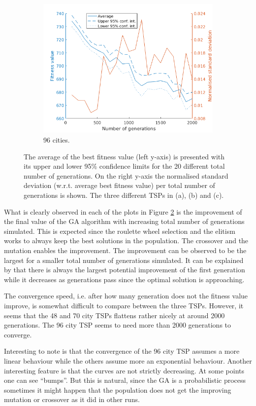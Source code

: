 \documentclass[]{article}
\begin{document}
\begin{figure}[H]
  \begin{subfigure}{\textwidth}
     \centering
     \includegraphics[width=0.5\linewidth]{../GA_TSP/t296.png}
     \caption{96 cities.}
     \label{sfig:t296}
  \end{subfigure}%
\caption{The average of the best fitness value (left y-axis) is presented with its upper and lower 95\% confidence limits for the 20 different total number of generations. On the right y-axis the normalised standard deviation (w.r.t. average best fitness value) per total number of generations is shown. The three different TSPs in (a), (b) and (c).}
  \label{fig:task2}
\end{figure}

What is clearly observed in each of the plots in Figure \ref{fig:task2}  is the improvement of the final value of the GA algorithm with increasing total number of generations simulated.
This is expected since the roulette wheel selection and the elitism works to always keep the best solutions in the population.
The crossover and the mutation enables the improvement.
The improvement can be observed to be the largest for a smaller total number of generations simulated.
It can be explained by that there is always the largest potential improvement of the first generation while it decreases as generations pass since the optimal solution is approaching.

The convergence speed, i.e. after how many generation does not the fitness value improve, is somewhat difficult to compare between the three TSPs.
However, it seems that the 48 and 70 city TSPs flattens rather nicely at around 2000 generations.
The 96 city TSP seems to need more than 2000 generations to converge.

Interesting to note is that the convergence of the 96 city TSP assumes a more linear behaviour while the others assume more an exponential behaviour.
Another interesting feature is that the curves are not strictly decreasing.
At some points one can see ``bumps''.
But this is natural, since the GA is a probabilistic process sometimes it might happen that the population does not get the improving mutation or crossover as it did in other runs.
\end{document}
